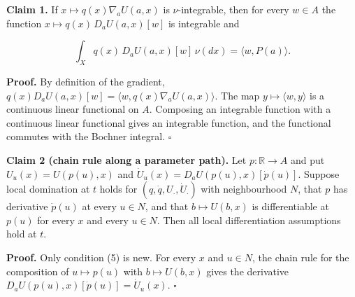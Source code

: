 \documentclass[11pt,a4paper]{report}
\begin{document}
\textbf{Claim 1.} If \(x\mapsto q(x)\nabla_aU(a,x)\) is \(\nu\)-integrable, then for every \(w\in A\) the function \(x\mapsto q(x)\,D_aU(a,x)[w]\) is integrable and


\[\int_Xq(x)\,D_aU(a,x)[w]\,\nu(dx)=\langle w,P(a)\rangle.\]


\textbf{Proof.} By definition of the gradient, \(q(x)D_aU(a,x)[w]=\langle w,q(x)\nabla_aU(a,x)\rangle\). The map \(y\mapsto\langle w,y\rangle\) is a continuous linear functional on \(A\). Composing an integrable function with a continuous linear functional gives an integrable function, and the functional commutes with the Bochner integral. \(\square\)




\textbf{Claim 2 (chain rule along a parameter path).} Let \(p:\mathbb R\to A\) and put \(U_u(x)=U(p(u),x)\) and \(\dot U_u(x)=D_aU(p(u),x)[\dot p(u)]\). Suppose local domination at \(t\) holds for \((q,\dot q,U_\cdot,\dot U_\cdot)\) with neighbourhood \(N\), that \(p\) has derivative \(\dot p(u)\) at every \(u\in N\), and that \(b\mapsto U(b,x)\) is differentiable at \(p(u)\) for every \(x\) and every \(u\in N\). Then all local differentiation assumptions hold at \(t\).




\textbf{Proof.} Only condition (5) is new. For every \(x\) and \(u\in N\), the chain rule for the composition of \(u\mapsto p(u)\) with \(b\mapsto U(b,x)\) gives the derivative \(D_aU(p(u),x)[\dot p(u)]=\dot U_u(x)\). \(\square\)
\end{document}
